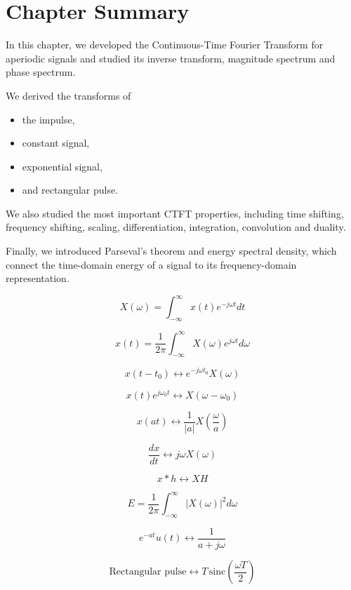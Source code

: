 
\section{Chapter Summary}

In this chapter, we developed the Continuous-Time Fourier Transform for aperiodic signals and studied its inverse transform, magnitude spectrum and phase spectrum.

We derived the transforms of

\begin{itemize}
\item the impulse,
\item constant signal,
\item exponential signal,
\item and rectangular pulse.
\end{itemize}

We also studied the most important CTFT properties, including time shifting, frequency shifting, scaling, differentiation, integration, convolution and duality.

Finally, we introduced Parseval’s theorem and energy spectral density, which connect the time-domain energy of a signal to its frequency-domain representation.


\begin{tcolorbox}[title=One-Minute Revision,colback=blue!5]

\[
X(\omega)=
\int_{-\infty}^{\infty}x(t)e^{-j\omega t}dt
\]

\[
x(t)=
\frac{1}{2\pi}
\int_{-\infty}^{\infty}X(\omega)e^{j\omega t}d\omega
\]

\[
x(t-t_0)\leftrightarrow e^{-j\omega t_0}X(\omega)
\]

\[
x(t)e^{j\omega_0 t}\leftrightarrow X(\omega-\omega_0)
\]

\[
x(at)\leftrightarrow \frac{1}{|a|}X\left(\frac{\omega}{a}\right)
\]

\[
\frac{dx}{dt}\leftrightarrow j\omega X(\omega)
\]

\[
x*h\leftrightarrow XH
\]

\[
E=
\frac{1}{2\pi}
\int_{-\infty}^{\infty}|X(\omega)|^2d\omega
\]

\[
e^{-at}u(t)\leftrightarrow \frac{1}{a+j\omega}
\]

\[
\text{Rectangular pulse}\leftrightarrow
T\,\mathrm{sinc}\left(\frac{\omega T}{2}\right)
\]

\end{tcolorbox}
